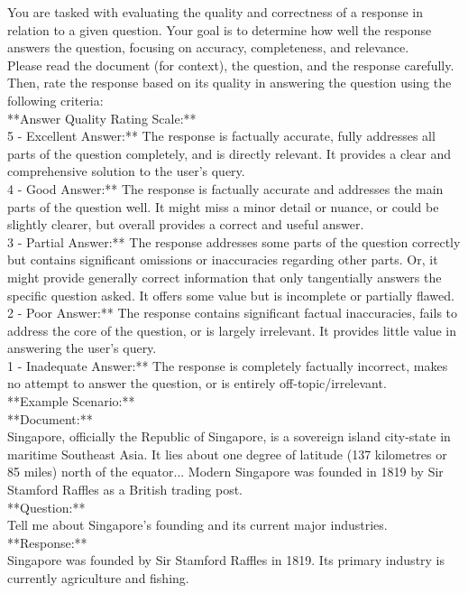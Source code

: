 
\begin{tcolorbox}[
    enhanced,
    colback=white, %
    colframe=black, %
    arc=5mm, %
    boxrule=1pt,
    left=2mm, %
    right=2mm, %
    top=1mm, %
    bottom=1mm %
]

You are tasked with evaluating the quality and correctness of a response in relation to a given question. Your goal is to determine how well the response answers the question, focusing on accuracy, completeness, and relevance.\\

Please read the document (for context), the question, and the response carefully. Then, rate the response based on its quality in answering the question using the following criteria:\\

**Answer Quality Rating Scale:**\\

5 - Excellent Answer:** The response is factually accurate, fully addresses all parts of the question completely, and is directly relevant. It provides a clear and comprehensive solution to the user's query.\\
4 - Good Answer:** The response is factually accurate and addresses the main parts of the question well. It might miss a minor detail or nuance, or could be slightly clearer, but overall provides a correct and useful answer.\\
3 - Partial Answer:** The response addresses some parts of the question correctly but contains significant omissions or inaccuracies regarding other parts. Or, it might provide generally correct information that only tangentially answers the specific question asked. It offers some value but is incomplete or partially flawed.\\
2 - Poor Answer:** The response contains significant factual inaccuracies, fails to address the core of the question, or is largely irrelevant. It provides little value in answering the user's query.\\
1 - Inadequate Answer:** The response is completely factually incorrect, makes no attempt to answer the question, or is entirely off-topic/irrelevant.\\

**Example Scenario:**\\

**Document:**\\
Singapore, officially the Republic of Singapore, is a sovereign island city-state in maritime Southeast Asia. It lies about one degree of latitude (137 kilometres or 85 miles) north of the equator... Modern Singapore was founded in 1819 by Sir Stamford Raffles as a British trading post.\\
**Question:**\\
Tell me about Singapore's founding and its current major industries.\\
**Response:**\\
Singapore was founded by Sir Stamford Raffles in 1819. Its primary industry is currently agriculture and fishing.\\


\end{tcolorbox}
